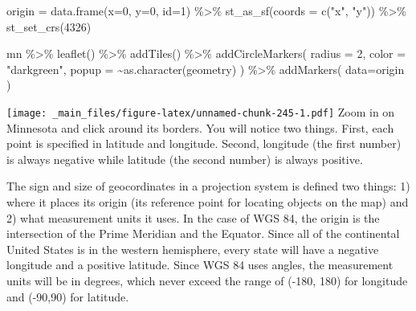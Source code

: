 \documentclass[
]{book}
\newenvironment{Shaded}{\begin{snugshade}}{\end{snugshade}}
\newcommand{\AttributeTok}[1]{\textcolor[rgb]{0.77,0.63,0.00}{#1}}
\newcommand{\DecValTok}[1]{\textcolor[rgb]{0.00,0.00,0.81}{#1}}
\newcommand{\FunctionTok}[1]{\textcolor[rgb]{0.00,0.00,0.00}{#1}}
\newcommand{\NormalTok}[1]{#1}
\newcommand{\OtherTok}[1]{\textcolor[rgb]{0.56,0.35,0.01}{#1}}
\newcommand{\SpecialCharTok}[1]{\textcolor[rgb]{0.00,0.00,0.00}{#1}}
\newcommand{\StringTok}[1]{\textcolor[rgb]{0.31,0.60,0.02}{#1}}
\begin{document}
\begin{Shaded}
\begin{Highlighting}[]
\NormalTok{origin }\OtherTok{=} \FunctionTok{data.frame}\NormalTok{(}\AttributeTok{x=}\DecValTok{0}\NormalTok{, }\AttributeTok{y=}\DecValTok{0}\NormalTok{, }\AttributeTok{id=}\DecValTok{1}\NormalTok{) }\SpecialCharTok{\%\textgreater{}\%}
  \FunctionTok{st\_as\_sf}\NormalTok{(}\AttributeTok{coords =} \FunctionTok{c}\NormalTok{(}\StringTok{"x"}\NormalTok{, }\StringTok{"y"}\NormalTok{)) }\SpecialCharTok{\%\textgreater{}\%}
  \FunctionTok{st\_set\_crs}\NormalTok{(}\DecValTok{4326}\NormalTok{)}

\NormalTok{mn }\SpecialCharTok{\%\textgreater{}\%}
  \FunctionTok{leaflet}\NormalTok{() }\SpecialCharTok{\%\textgreater{}\%}
  \FunctionTok{addTiles}\NormalTok{() }\SpecialCharTok{\%\textgreater{}\%}
  \FunctionTok{addCircleMarkers}\NormalTok{(}
    \AttributeTok{radius =} \DecValTok{2}\NormalTok{,}
    \AttributeTok{color =} \StringTok{"darkgreen"}\NormalTok{,}
    \AttributeTok{popup =} \SpecialCharTok{\textasciitilde{}}\FunctionTok{as.character}\NormalTok{(geometry)}
\NormalTok{  ) }\SpecialCharTok{\%\textgreater{}\%}
  \FunctionTok{addMarkers}\NormalTok{(}
    \AttributeTok{data=}\NormalTok{origin}
\NormalTok{  )}
\end{Highlighting}
\end{Shaded}

\texttt{[image: \_main\_files/figure-latex/unnamed-chunk-245-1.pdf]}
Zoom in on Minnesota and click around its borders. You will notice two things. First, each point is specified in latitude and longitude. Second, longitude (the first number) is always negative while latitude (the second number) is always positive.

The sign and size of geocordinates in a projection system is defined two things: 1) where it places its origin (its reference point for locating objects on the map) and 2) what measurement units it uses. In the case of WGS 84, the origin is the intersection of the Prime Meridian and the Equator. Since all of the continental United States is in the western hemisphere, every state will have a negative longitude and a positive latitude. Since WGS 84 uses angles, the measurement units will be in degrees, which never exceed the range of (-180, 180) for longitude and (-90,90) for latitude.
\end{document}
